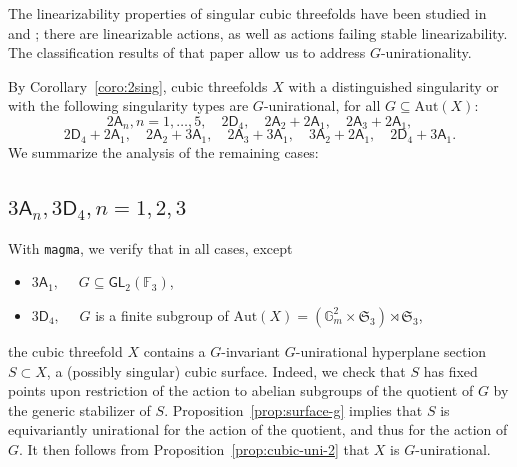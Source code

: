\documentclass[12pt,reqno]{amsart}
\theoremstyle{plain}
\theoremstyle{remark}
\theoremstyle{definition}
\numberwithin{equation}{section}
\def\sA{{\mathsf A}}
\def\sD{{\mathsf D}}
\def\fS{{\mathfrak S}}
\def\fS{{\mathfrak S}}
\def\bG{{\mathbb G}}
\def\bF{{\mathbb F}}
\def\Aut{\mathrm{Aut}}
\def\GL{\mathsf{GL}}
\begin{document}



The linearizability properties of singular cubic threefolds have been studied in \cite{CTZ-cubic} and \cite{CMTZ}; there are linearizable actions, as well as actions failing stable linearizability. The classification results of that paper allow us to address $G$-unirationality. 





By Corollary~\ref{coro:2sing}, cubic threefolds $X$ with a distinguished singularity or with the following singularity types are $G$-unirational, for all $G\subseteq \Aut(X)$: 
$$
2\sA_n,n=1,\ldots,5,\quad  2\sD_4, \quad  2\sA_2+2\sA_1, \quad 2\sA_3+2\sA_1, 
$$
$$
2\sD_4+2\sA_1, \quad 2\sA_2+3\sA_1, \quad  2\sA_3+3\sA_1, \quad 3\sA_2+2\sA_1, \quad 2\sD_4+3\sA_1.
$$
We summarize the analysis of the remaining cases:

\subsection*{$3\sA_n, 3\sD_4, n=1,2,3$}
With {\tt magma}, we verify that in all cases, except 
\begin{itemize}
    \item[(1)] $3\sA_1,\quad$  $G\subseteq \GL_2(\bF_3)$,
    \item[(2)] $3\sD_4,\quad $ $G$ is a finite subgroup of $\Aut(X)=(\bG_m^2\times \fS_3)\rtimes\fS_3$, 
\end{itemize}
the cubic threefold $X$ contains a $G$-invariant 
$G$-unirational hyperplane section $S\subset X$, a (possibly singular) cubic surface. Indeed, we check that $S$ has fixed points upon restriction of the action to abelian subgroups of the quotient of $G$ by the generic stabilizer of $S$. Proposition~\ref{prop:surface-g} implies that $S$ is equivariantly unirational for the action of the quotient, and thus for the action of $G$. 
It then follows from Proposition~\ref{prop:cubic-uni-2} that $X$ is $G$-unirational. 


\ 
\end{document}
